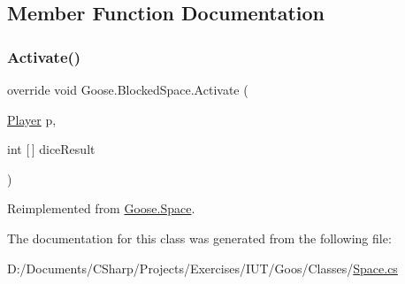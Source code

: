 \subsection{Member Function Documentation}
\mbox{\label{class_goose_1_1_blocked_space_a08ceb6c567dd3e419f129ac04633f206}} 
\subsubsection{\texorpdfstring{Activate()}{Activate()}}
{\footnotesize\ttfamily override void Goose.\+Blocked\+Space.\+Activate (\begin{DoxyParamCaption}\item[{\hyperlink{class_goose_1_1_player}{Player}}]{p,  }\item[{int \mbox{[}$\,$\mbox{]}}]{dice\+Result }\end{DoxyParamCaption})\hspace{0.3cm}{\ttfamily [virtual]}}



Reimplemented from \hyperlink{class_goose_1_1_space_a2c04479a1a06c1a35a6b1d8fb9056c49}{Goose.\+Space}.



The documentation for this class was generated from the following file\+:\begin{DoxyCompactItemize}
\item 
D\+:/\+Documents/\+C\+Sharp/\+Projects/\+Exercises/\+I\+U\+T/\+Goos/\+Classes/\hyperlink{_space_8cs}{Space.\+cs}\end{DoxyCompactItemize}
